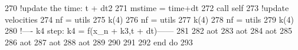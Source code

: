 \begin{DoxyCode}
270         \textcolor{comment}{!update the time: t + dt2}
271         mstime = time+dt
272         \textcolor{keyword}{call }self%
273         \textcolor{comment}{!update velocities}
274         nf = utils%
275         k(4)%
276         nf = utils%
277         k(4)%
278         nf = utils%
279         k(4)%
280         \textcolor{comment}{!---- k4 step: k4 = f(x\_n + k3,t + dt)------}
281 
282         aot%
283         aot%
284         aot%
285 
286         aot%
287         aot%
288         aot%
289 
290 
291 
292 \textcolor{keywordflow}{    end do}
293 
\end{DoxyCode}
